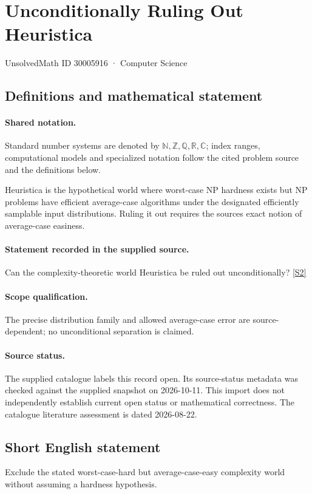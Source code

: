 \documentclass[11pt]{article}
\newcommand{\sref}[2]{\hyperlink{source:#1:#2}{[S#2]}}
\begin{document}
\setcounter{section}{30005915}
\section{Unconditionally Ruling Out Heuristica}\label{30005916}
{\small\sffamily UnsolvedMath ID 30005916 · Computer Science}
\subsection{Definitions and mathematical statement}

\paragraph{Shared notation.}Standard number systems are denoted by $\mathbb N,\mathbb Z,\mathbb Q,\mathbb R,\mathbb C$; index ranges, computational models and specialized notation follow the cited problem source and the definitions below.


Heuristica is the hypothetical world where worst-case NP hardness exists but NP problems have efficient average-case algorithms under the designated efficiently samplable input distributions. Ruling it out requires the source\textquotesingle s exact notion of average-case easiness.
\paragraph{Statement recorded in the supplied source.}
Can the complexity-theoretic world Heuristica be ruled out unconditionally? \sref{30005916}{2}
\paragraph{Scope qualification.}
The precise distribution family and allowed average-case error are source-dependent; no unconditional separation is claimed.
\paragraph{Source status.}
The supplied catalogue labels this record open. Its source-status metadata was checked against the supplied snapshot on 2026-10-11. This import does not independently establish current open status or mathematical correctness. The catalogue literature assessment is dated 2026-08-22.
\subsection{Short English statement}
Exclude the stated worst-case-hard but average-case-easy complexity world without assuming a hardness hypothesis.
\end{document}

